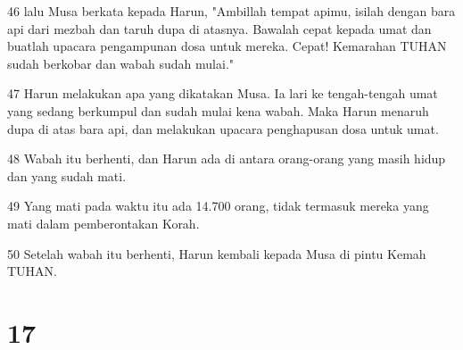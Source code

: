 \par 46 lalu Musa berkata kepada Harun, "Ambillah tempat apimu, isilah dengan bara api dari mezbah dan taruh dupa di atasnya. Bawalah cepat kepada umat dan buatlah upacara pengampunan dosa untuk mereka. Cepat! Kemarahan TUHAN sudah berkobar dan wabah sudah mulai."
\par 47 Harun melakukan apa yang dikatakan Musa. Ia lari ke tengah-tengah umat yang sedang berkumpul dan sudah mulai kena wabah. Maka Harun menaruh dupa di atas bara api, dan melakukan upacara penghapusan dosa untuk umat.
\par 48 Wabah itu berhenti, dan Harun ada di antara orang-orang yang masih hidup dan yang sudah mati.
\par 49 Yang mati pada waktu itu ada 14.700 orang, tidak termasuk mereka yang mati dalam pemberontakan Korah.
\par 50 Setelah wabah itu berhenti, Harun kembali kepada Musa di pintu Kemah TUHAN.

\chapter{17}

